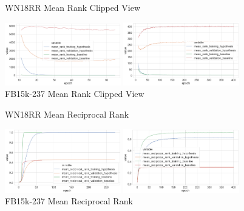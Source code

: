 \begin{figure}[H]
	\parbox{.5\linewidth}{
   		\caption{WN18RR Mean Rank Clipped View}
   		\centering
    		\includegraphics[width=0.45\textwidth, height=0.2\textheight]{WN18RR_mean_rank_Results_Clipped}
		}
	\hfill
	\parbox{.5\linewidth}{
		\caption{FB15k-237 Mean Rank Clipped View}
   		\centering
		\includegraphics[width=0.45\textwidth, height=0.2\textheight]{FB15k-237_mean_rank_Results_Clipped}
		}
\end{figure}


\begin{figure}[H]
	\parbox{.5\linewidth}{
   		\caption{WN18RR Mean Reciprocal Rank}
   		\centering
    		\includegraphics[width=0.45\textwidth, height=0.2\textheight]{WN18RR_mean_reciprocal_rank_Results}
		}
	\hfill
	\parbox{.5\linewidth}{
		\caption{FB15k-237 Mean Reciprocal Rank}
   		\centering
		\includegraphics[width=0.45\textwidth, height=0.2\textheight]{FB15k-237_mean_reciprocal_rank_Results}
		}
\end{figure}

